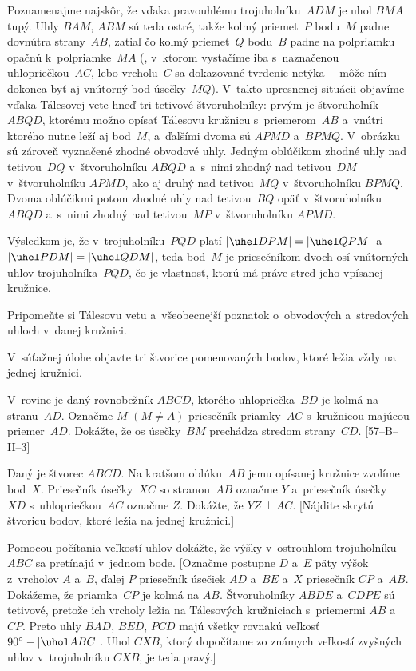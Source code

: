{%
Poznamenajme najskôr, že vďaka pravouhlému trojuholníku~$ADM$ je uhol $BMA$
tupý. Uhly $BAM$, $ABM$ sú teda ostré, takže kolmý priemet~$P$
bodu~$M$ padne dovnútra strany~$AB$, zatiaľ čo
kolmý priemet~$Q$ bodu~$B$ padne na polpriamku
opačnú k~polpriamke~$MA$ (\obr, v~ktorom vystačíme iba
s~naznačenou uhlopriečkou~$AC$, lebo vrcholu~$C$ sa dokazované
tvrdenie netýka~-- môže ním dokonca byť aj vnútorný bod úsečky~$MQ$).
V~takto upresnenej situácii objavíme vďaka Tálesovej vete
hneď tri tetivové štvoruholníky: prvým je štvoruholník $ABQD$,
ktorému možno opísať Tálesovu kružnicu s~priemerom~$AB$
a~vnútri ktorého nutne leží aj bod~$M$, a~ďalšími dvoma sú
$APMD$ a~$BPMQ$.
V~obrázku sú zároveň vyznačené zhodné obvodové uhly.
Jedným oblúčikom zhodné uhly nad tetivou~$DQ$ v~štvoruholníku $ABQD$ a~s~nimi
zhodný nad tetivou~$DM$ v~štvoruholníku $APMD$, ako aj druhý nad tetivou~$MQ$
v~štvoruholníku $BPMQ$. Dvoma oblúčikmi potom zhodné uhly nad tetivou~$BQ$
opäť v~štvoruholníku $ABQD$ a~s~nimi zhodný nad tetivou~$MP$ v~štvoruholníku $APMD$.
%

Výsledkom je, že v~trojuholníku~$PQD$ platí
$|\uhel DPM|=|\uhel QPM|$ a~$|\uhel PDM|=|\uhel QDM|$, teda bod~$M$
je priesečníkom dvoch osí vnútorných uhlov trojuholníka~$PQD$,
čo je vlastnosť, ktorú má práve stred jeho vpísanej kružnice.


Pripomeňte si Tálesovu vetu a~všeobecnejší poznatok
o~obvodových a~stredových uhloch v~danej kružnici.

V~súťažnej úlohe objavte tri štvorice pomenovaných bodov,
ktoré ležia vždy na jednej kružnici.

\D
V~rovine je daný rovnobežník $ABCD$, ktorého uhlopriečka~$BD$ je kolmá na stranu~$AD$. Označme $M$ $(M\ne A)$ priesečník priamky~$AC$ s~kružnicou majúcou priemer~$AD$. Dokážte, že os úsečky~$BM$ prechádza stredom strany~$CD$. [57--B--II--3]

Daný je štvorec $ABCD$. Na kratšom oblúku~$AB$ jemu opísanej kružnice
zvolíme bod~$X$. Priesečník úsečky~$XC$ so stranou~$AB$ označme
$Y$ a~priesečník úsečky~$XD$ s~uhlopriečkou~$AC$ označme $Z$. Dokážte, že
$YZ \perp AC$. [Nájdite skrytú štvoricu bodov, ktoré ležia na jednej
kružnici.]

Pomocou počítania veľkostí uhlov dokážte, že výšky v~ostrouhlom
trojuholníku $ABC$ sa pretínajú v~jednom bode. [Označme postupne $D$ a~$E$
päty výšok z~vrcholov $A$ a~$B$, ďalej $P$ priesečník úsečiek $AD$
a~$BE$ a~$X$ priesečník $CP$ a~$AB$. Dokážeme, že priamka~$CP$ je kolmá
na $AB$. Štvoruholníky $ABDE$ a~$CDPE$ sú tetivové, pretože ich vrcholy
ležia na Tálesových kružniciach s~priemermi $AB$ a~$CP$. Preto uhly
$BAD$, $BED$, $PCD$ majú všetky rovnakú veľkosť $90^\circ-|\uhol ABC|$. Uhol
$CXB$, ktorý dopočítame zo známych veľkostí zvyšných uhlov
v~trojuholníku $CXB$, je teda pravý.]
}

